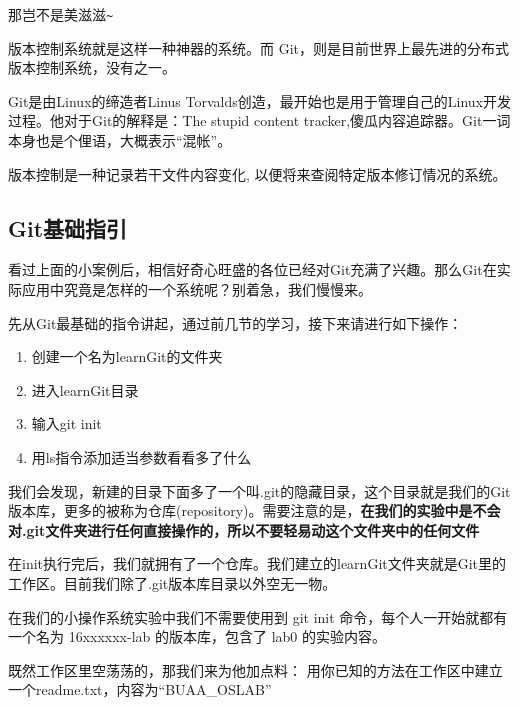 那岂不是美滋滋\verb|~|

版本控制系统就是这样一种神器的系统。而 Git，则是目前世界上最先进的分布式版本控制系统，没有之一。

Git是由Linux的缔造者Linus Torvalds创造，最开始也是用于管理自己的Linux开发过程。他对于Git的解释是：The stupid content tracker,傻瓜内容追踪器。Git一词本身也是个俚语，大概表示“混帐”。

\begin{note}
版本控制是一种记录若干文件内容变化, 以便将来查阅特定版本修订情况的系统。
\end{note}

\subsection{Git基础指引}
看过上面的小案例后，相信好奇心旺盛的各位已经对Git充满了兴趣。那么Git在实际应用中究竟是怎样的一个系统呢？别着急，我们慢慢来。

先从Git最基础的指令讲起，通过前几节的学习，接下来请进行如下操作：
\begin{enumerate}
    \item 创建一个名为learnGit的文件夹
    \item 进入learnGit目录
	\item 输入git init
	\item 用ls指令添加适当参数看看多了什么
\end{enumerate}
我们会发现，新建的目录下面多了一个叫.git的隐藏目录，这个目录就是我们的Git版本库，更多的被称为仓库(repository)。需要注意的是，\textbf{在我们的实验中是不会对.git文件夹进行任何直接操作的，所以不要轻易动这个文件夹中的任何文件}

在init执行完后，我们就拥有了一个仓库。我们建立的learnGit文件夹就是Git里的工作区。目前我们除了.git版本库目录以外空无一物。

\begin{note}
在我们的小操作系统实验中我们不需要使用到 git init 命令，每个人一开始就都有一个名为 16xxxxxx-lab 的版本库，包含了 lab0 的实验内容。
\end{note}

既然工作区里空荡荡的，那我们来为他加点料：
用你已知的方法在工作区中建立一个readme.txt，内容为“BUAA\_OSLAB”

